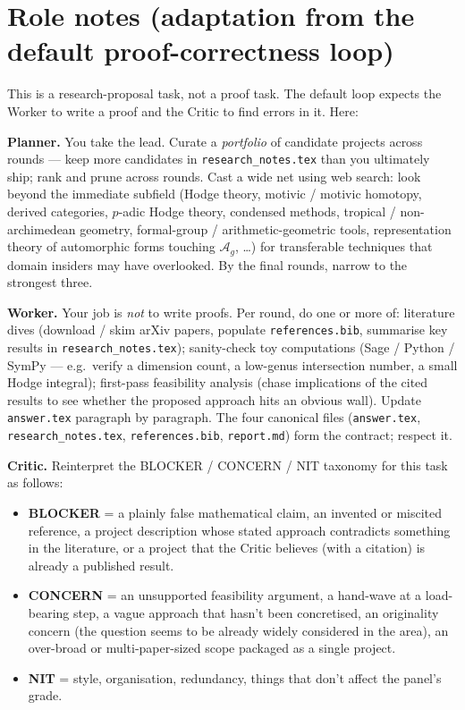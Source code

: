 \section*{Role notes (adaptation from the default proof-correctness loop)}

This is a research-proposal task, not a proof task. The default loop
expects the Worker to write a proof and the Critic to find errors in
it. Here:

\textbf{Planner.} You take the lead. Curate a \emph{portfolio} of
candidate projects across rounds --- keep more candidates in
\texttt{research\_notes.tex} than you ultimately ship; rank and prune
across rounds. Cast a wide net using web search: look beyond the
immediate subfield (Hodge theory, motivic / motivic homotopy, derived
categories, $p$-adic Hodge theory, condensed methods, tropical /
non-archimedean geometry, formal-group / arithmetic-geometric tools,
representation theory of automorphic forms touching $\mathcal{A}_g$,
\dots) for transferable techniques that domain insiders may have
overlooked. By the final rounds, narrow to the strongest three.

\textbf{Worker.} Your job is \emph{not} to write proofs. Per round, do
one or more of: literature dives (download / skim arXiv papers,
populate \texttt{references.bib}, summarise key results in
\texttt{research\_notes.tex}); sanity-check toy computations (Sage /
Python / SymPy --- e.g.\ verify a dimension count, a low-genus
intersection number, a small Hodge integral); first-pass feasibility
analysis (chase implications of the cited results to see whether the
proposed approach hits an obvious wall). Update \texttt{answer.tex}
paragraph by paragraph. The four canonical files (\texttt{answer.tex},
\texttt{research\_notes.tex}, \texttt{references.bib},
\texttt{report.md}) form the contract; respect it.

\textbf{Critic.} Reinterpret the BLOCKER / CONCERN / NIT taxonomy for
this task as follows:

\begin{itemize}
\item \textbf{BLOCKER} = a plainly false mathematical claim, an
  invented or miscited reference, a project description whose stated
  approach contradicts something in the literature, or a project that
  the Critic believes (with a citation) is already a published result.
\item \textbf{CONCERN} = an unsupported feasibility argument, a
  hand-wave at a load-bearing step, a vague approach that hasn't been
  concretised, an originality concern (the question seems to be already
  widely considered in the area), an over-broad or multi-paper-sized
  scope packaged as a single project.
\item \textbf{NIT} = style, organisation, redundancy, things that don't
  affect the panel's grade.
\end{itemize}

